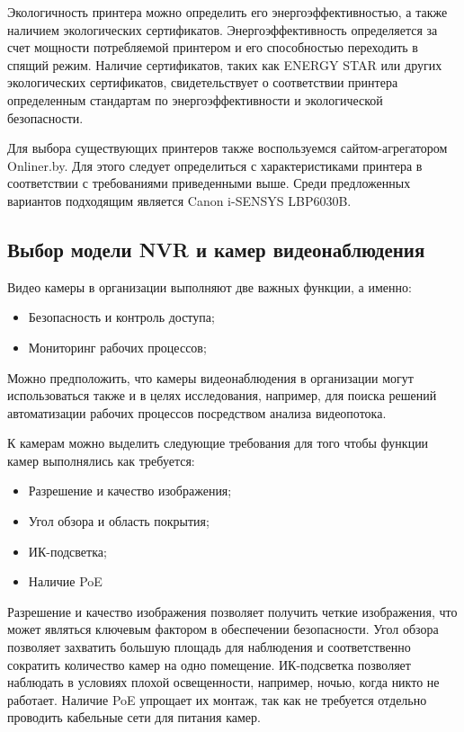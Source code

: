 Экологичность принтера можно определить его энергоэффективностью, а также наличием экологических сертификатов. 
Энергоэффективность определяется за счет мощности потребляемой принтером и его способностью переходить в спящий режим. 
Наличие сертификатов, таких как ENERGY STAR или других экологических сертификатов, свидетельствует о соответствии принтера 
определенным стандартам по энергоэффективности и экологической безопасности.

Для выбора существующих принтеров также воспользуемся сайтом-агрегатором Onliner.by. Для этого следует определиться с характеристиками
принтера в соответствии с требованиями приведенными выше. Среди предложенных вариантов подходящим является Canon i-SENSYS LBP6030B.

\subsection{Выбор модели NVR и камер видеонаблюдения}

Видео камеры в организации выполняют две важных функции, а именно:
\begin{itemize}
    \item Безопасность и контроль доступа;
    \item Мониторинг рабочих процессов;
\end{itemize}

Можно предположить, что камеры видеонаблюдения в организации могут использоваться также и в целях исследования, например, для 
поиска решений автоматизации рабочих процессов посредством анализа видеопотока.

К камерам можно выделить следующие требования для того чтобы функции камер выполнялись как требуется:

\begin{itemize}
    \item Разрешение и качество изображения;
    \item Угол обзора и область покрытия;
    \item ИК-подсветка;
    \item Наличие PoE
\end{itemize}

Разрешение и качество изображения позволяет получить четкие изображения, что может являться ключевым фактором в обеспечении безопасности. 
Угол обзора позволяет захватить большую площадь для наблюдения и соответственно сократить количество камер на одно помещение.
ИК-подсветка позволяет наблюдать в условиях плохой освещенности, например, ночью, когда никто не работает. Наличие PoE упрощает их
монтаж, так как не требуется отдельно проводить кабельные сети для питания камер.

